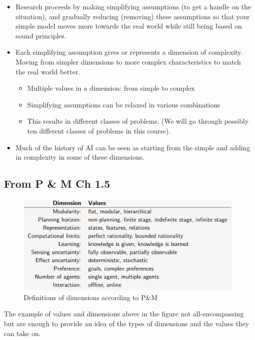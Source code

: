 \documentclass[12pt]{article}
\begin{document}
\begin{itemize}
    \item Research proceeds by making simplifying assumptions (to get a handle on the situation), and gradually reducing (removing) these assumptions so that your simple model moves more towards the real world while still being based on sound principles.
    \item Each simplifying assumption gives or represents a dimension of complexity. Moving from simpler dimensions to more complex characteristics to match the real world better.
    \begin{itemize}
        \item Multiple values in a dimension: from simple to complex
        \item Simplifying assumptions can be relaxed in various combinations
        \item This results in different classes of problems. (We will go through possibly ten different classes of problems in this course).
    \end{itemize}
    \item Much of the history of AI can be seen as starting from the simple and adding in complexity in some of these dimensions.
\end{itemize}

\subsection{From P \& M Ch 1.5}

\begin{figure}[h!]
        \centering
        \includegraphics[scale=0.4]{definition-dimensions.png}
        \caption{Definitions of dimensions according to P\&M}
        \label{fig:my_label}
\end{figure}

\noindent The example of values and dimensions above in the figure not all-encompassing but are enough to provide an idea of the types of dimensions and the values they can take on.
\end{document}
